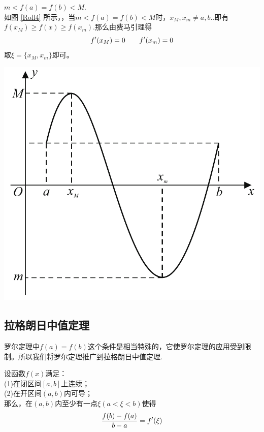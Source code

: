\noindent \begin{minipage}{0.6\linewidth}
\noindent {} $m<f(a)=f(b)<M$.\\
\kg 如图 \ref{Roll4} 所示，，当$m<f(a)=f(b)<M时$，$x_M,x_m\neq a,b.$.即有$f(x_M)\geq f(x)\geq f(x_m)$.那么由费马引理得
\begin{equation}
	f'(x_M)=0\hspace*{2em} f'(x_m)=0
\end{equation}
取$\xi=\big\lbrace x_M,x_m \big\rbrace$即可。	
\end{minipage}
\begin{minipage}{0.4\linewidth}
	\centering
	\includegraphics[width=0.95\linewidth]{pic/C-2/Roll_4}
	\vspace*{-1.5em}
	\label{Roll4}
\end{minipage}

\subsection{拉格朗日中值定理}
罗尔定理中$f(a)=f(b)$这个条件是相当特殊的，它使罗尔定理的应用受到限制。所以我们将罗尔定理推广到拉格朗日中值定理.\\

\sj
{}

\noindent 设函数$f(x)$满足：
\\ \kg(1)\enspace 在闭区间$[a,b]$上连续；\\
\kg (2)\enspace 在开区间$(a,b)$内可导；\\
那么，在$(a,b)$内至少有一点$\xi(a<\xi<b)$使得
\begin{equation}
	\frac{f(b)-f(a)}{b-a}=f'(\xi)\sj
\end{equation}

